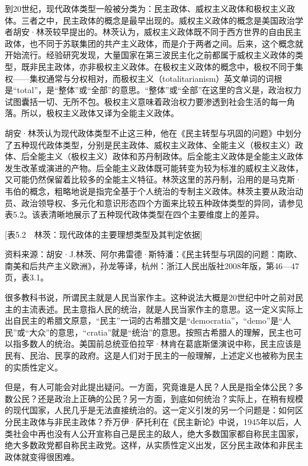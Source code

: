 到20世纪，现代政体类型一般被分类为：民主政体、威权主义政体和极权主义政体。三者之中，民主政体的概念是最早出现的。威权主义政体的概念是美国政治学者胡安·林茨较早提出的。林茨认为，威权主义政体既不同于西方世界的自由民主政体，也不同于苏联集团的共产主义政体，而是介于两者之间。后来，这个概念就开始流行。经验研究发现，大量国家在第三波民主化之前都属于威权主义政体的类型，既非民主政体，亦非极权主义政体。在极权主义政体的概念中，极权不同于集权——集权通常与分权相对，而极权主义（totalitarianism）英文单词的词根是“total”，是“整体”或“全部”的意思。“整体”或“全部”在这里的含义是，政治权力试图囊括一切、无所不包。极权主义意味着政治权力要渗透到社会生活的每一角落。所以，极权主义政体又译为全能主义政体。

胡安·林茨认为现代政体类型不止这三种，他在《民主转型与巩固的问题》中划分了五种现代政体类型，分别是民主政体、威权主义政体、全能主义（极权主义）政体、后全能主义（极权主义）政体和苏丹制政体。后全能主义政体是全能主义政体发生改革或演进的产物。后全能主义政体既可能转变为较为标准的威权主义政体，又可能仍然保留着比较多的全能主义特征。林茨这里的苏丹制，沿用的是马克斯·韦伯的概念，粗略地说是指完全基于个人统治的专制主义政体。林茨主要从政治动员、政治领导权、多元化和意识形态四个方面来比较五种政体类型的异同，请参见表5.2。该表清晰地展示了五种现代政体类型在四个主要维度上的差异。

[表5.2　林茨：现代政体的主要理想类型及其判定依据]



资料来源：胡安·J.林茨、阿尔弗雷德·斯特潘：《民主转型与巩固的问题：南欧、南美和后共产主义欧洲》，孙龙等译，杭州：浙江人民出版社2008年版，第46—47页，表3.1。


很多教科书说，所谓民主就是人民当家作主。这种说法大概是20世纪中叶之前对民主的主流表述。民主意指人民的统治，就是人民当家作主的意思。这一定义实际上出自民主的希腊文原意，“民主”一词的古希腊文是“democratia”，“demo”是“人民”或“大众”的意思，“cratia”就是“统治”的意思。按照古希腊人的理解，民主也可以指多数人的统治。美国前总统亚伯拉罕·林肯在葛底斯堡演说中称，民主应该是民有、民治、民享的政府。这是人们对于民主的一般理解，上述定义也被称为民主的实质性定义。

但是，有人可能会对此提出疑问。一方面，究竟谁是人民？人民是指全体公民？多数公民？还是政治上正确的公民？另一方面，到底如何统治？实际上，在稍有规模的现代国家，人民几乎是无法直接统治的。这一定义引发的另一个问题是：如何区分民主政体与非民主政体？乔万伊·萨托利在《民主新论》中说，1945年以后，人类社会中再也没有人公开宣称自己是民主的敌人，绝大多数国家都自称民主国家，绝大多数政党都自称民主政党。这样，从实质性定义出发，区分民主政体和非民主政体就变得很困难。

